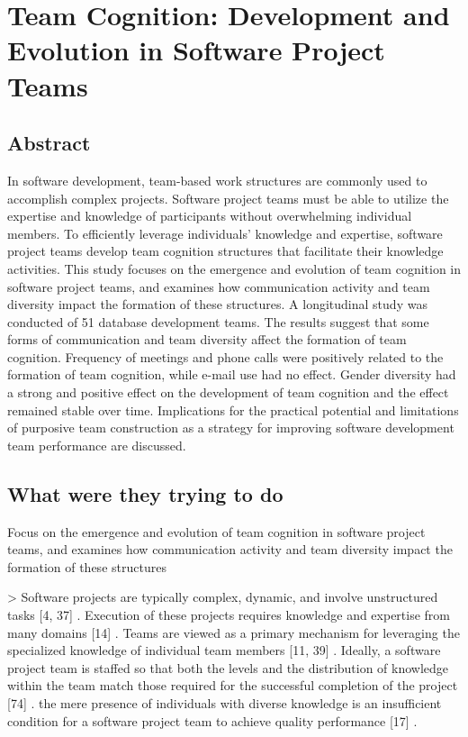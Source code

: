 \section{Team Cognition: Development and Evolution in Software Project Teams}

\subsection{Abstract}

In software development, team-based work structures are commonly used to accomplish complex projects. Software project teams must be able to utilize the expertise and knowledge of participants without overwhelming individual members. To efficiently leverage individuals' knowledge and expertise, software project teams develop team cognition structures that facilitate their knowledge activities. This study focuses on the emergence and evolution of team cognition in software project teams, and examines how communication activity and team diversity impact the formation of these structures. A longitudinal study was conducted of 51 database development teams. The results suggest that some forms of communication and team diversity affect the formation of team cognition. Frequency of meetings and phone calls were positively related to the formation of team cognition, while e-mail use had no effect. Gender diversity had a strong and positive effect on the development of team cognition and the effect remained stable over time. Implications for the practical potential and limitations of purposive team construction as a strategy for improving software development team performance are discussed.

\subsection{What were they trying to do}

Focus on the emergence and evolution of team cognition in software project teams, and examines how communication activity and team diversity impact the formation of these structures

> Software projects are typically complex, dynamic, and involve unstructured tasks [4, 37] \cite{brodbeckCommunicationPerformanceSoftware2001,krautCoordinationSoftwareDevelopment1995}. Execution of these projects requires knowledge and expertise from many domains [14] \cite{curtisFieldStudySoftware1988}. Teams are viewed as a primary mechanism for leveraging the specialized knowledge of individual team members [11, 39] \cite{cookeMeasuringTeamKnowledge2001,lewisMeasuringTransactiveMemory2003}. Ideally, a software project team is staffed so that both the levels and the distribution of knowledge within the team match those required for the successful completion of the project [74] \cite{walzSoftwareDesignTeam1993}. the mere presence of individuals with diverse knowledge is an insufficient condition for a software project team to achieve quality performance [17] \cite{farajCoordinatingExpertiseSoftware2000}.

